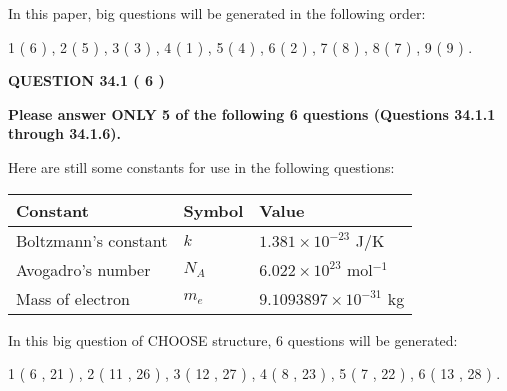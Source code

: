 \documentclass[12pt]{article}
\begin{document}
\vspace{0.3in}
 
 
   
   
   
\vspace{0.2in}
   
In this paper, big questions will be generated in the following order: 
   
   
             1 (           6 )
 ,
             2 (           5 )
 ,
             3 (           3 )
 ,
             4 (           1 )
 ,
             5 (           4 )
 ,
             6 (           2 )
 ,
             7 (           8 )
 ,
             8 (           7 )
 ,
             9 (           9 )
 .
  
\vspace{0.2in}
  
{\textbf{\Large{QUESTION
34.1 
 (           6 )
}}}
  
  
 
{\textbf{\Large{Please answer ONLY
5 of the following
6 questions (Questions
34.1.1 through
34.1.6). }}}
 
Here are still some constants for use in the following questions:
 
 
\noindent\begin{tabular}{|l|l|l|}
\hline
Constant & Symbol & Value \\
\hline
 
Boltzmann's constant &
$k$ &
 $ 1.381 \times 10^{-23} $
J/K \\
\hline
 
Avogadro's number &
$N_A$ &
 $ 6.022 \times 10^{23} $
mol$^{-1}$ \\
\hline
 
Mass of electron &
$m_e$ &
 $ 9.1093897 \times 10^{-31} $
kg \\
\hline
 
\end{tabular}
 
   
\vspace{0.2in}
   
 In this big question of CHOOSE structure,            6  questions will be generated: 
  
  
             1 (           6 ,          21 )
 ,
             2 (          11 ,          26 )
 ,
             3 (          12 ,          27 )
 ,
             4 (           8 ,          23 )
 ,
             5 (           7 ,          22 )
 ,
             6 (          13 ,          28 )
 .
  
\vspace{0.2in}
  
\end{document}
